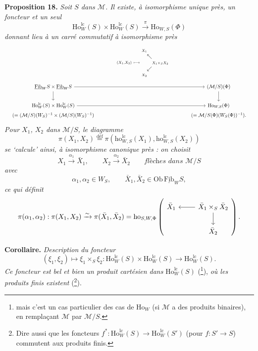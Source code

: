 \documentclass[11pt]{article}
\newcommand{\printedpage}[1]{\marginpar{\footnotesize p.~#1}}
\newcommand{\msp}[1]{\marginpar{\footnotesize [#1]}}
\newcommand{\Fibu}{\underline{\mathrm{Fib}}}
\newcommand{\Ho}{\mathrm{Ho}}
\newcommand{\ho}{\mathrm{ho}}
\newcommand{\lc}{\mathrm{lc}}
\begin{document}
\textbf{Proposition 18.} \textit{Soit $S$ dans $\mathcal{M}$. Il existe, à isomorphisme unique près, un foncteur et un seul}
\[
\Ho^{\lc}_W(S) \times \Ho^{\lc}_W(S) \xrightarrow{\pi} \Ho_{W,S}(\Phi)
\]
\textit{donnant lieu à un carré commutatif à isomorphisme près}
\[
\resizebox{\linewidth}{!}{$\begin{tikzcd}[ampersand replacement=\&, column sep=large]
 \& {\scriptstyle (X_1,X_2)\ \longmapsto\ \begin{array}{@{}c@{}c@{}c@{}} \scriptstyle X_1 & & \\ & \nwarrow & \\ & & \scriptstyle X_1 \times_S X_2 \\ & \swarrow & \\ \scriptstyle X_2 & & \end{array}} \& \\[-3ex]
\Fibu_W S \times \Fibu_W S \arrow[rr] \arrow[d] \& \& (\mathcal{M}/S)(\Phi) \arrow[d] \\
\Ho^{\lc}_W(S) \times \Ho^{\lc}_W(S) \arrow[rr] \& \& \Ho_{W,S}(\Phi) \\[-4ex]
(= (\mathcal{M}/S)(W_S)^{-1} \times (\mathcal{M}/S)(W_S)^{-1}) \& \& (= \mathcal{M}/S(\Phi)(W_S(\Phi))^{-1}).
\end{tikzcd}$}
\]
\textit{Pour $X_1$, $X_2$ dans $\mathcal{M}/S$, le diagramme}
\[
\pi(X_1, X_2) \overset{\text{déf}}{=} \pi(\ho^{\lc}_{W,S}(X_1), \ho^{\lc}_{W,S}(X_2))
\]
\textit{se `calcule' ainsi, à isomorphisme canonique près : on choisit}
\[
X_1 \xrightarrow{\alpha_1} \bar{X}_1, \qquad X_2 \xrightarrow{\alpha_2} \bar{X}_2 \qquad \textit{flèches dans } \mathcal{M}/S
\]
\textit{avec}
\[
\alpha_1, \alpha_2 \in W_S, \qquad \bar{X}_1, \bar{X}_2 \in \mathrm{Ob}\, \Fibu_W S,
\]
\textit{ce qui définit}
\[
\pi(\alpha_1, \alpha_2) : \pi(X_1, X_2) \xrightarrow{\sim} \pi(\bar{X}_1, \bar{X}_2) = \ho_{S,W,\Phi}
\left(
\begin{tikzcd}[ampersand replacement=\&]
\bar{X}_1 \& \bar{X}_1 \times_S \bar{X}_2 \arrow[l] \arrow[d] \\
 \& \bar{X}_2
\end{tikzcd}
\right).
\]

\setcounter{footnote}{131}

\printedpage{160}

\msp{page 247}

\textbf{Corollaire.} {\itshape Description du foncteur
\[
(\xi_1,\xi_2)\longmapsto\xi_1\times_S\xi_2 : \Ho^{\lc}_W(S)\times\Ho^{\lc}_W(S)\longrightarrow\Ho^{\lc}_W(S).
\]
Ce foncteur est bel et bien un produit cartésien dans} $\Ho^{\lc}_W(S)$ (\footnote{mais c'est un cas particulier des cas de $\Ho_W$ (si $\mathcal{M}$ a des produits binaires), en remplaçant $\mathcal{M}$ par $\mathcal{M}/S$.}), {\itshape où les produits finis existent} (\footnote{Dire aussi que les foncteurs $f^* : \Ho^{\lc}_W(S)\longrightarrow\Ho^{\lc}_W(S')$ (pour $f : S'\longrightarrow S$) commutent aux produits finis.}).
\end{document}
